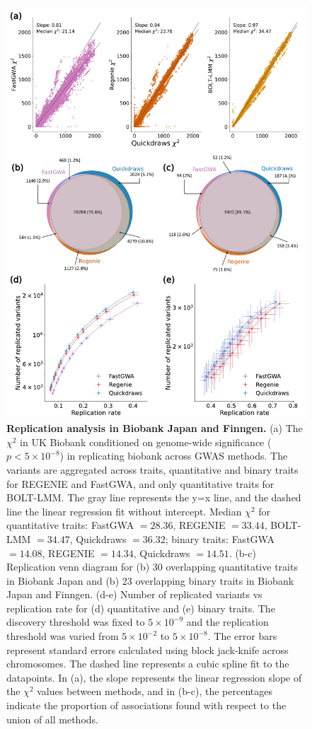 \begin{figure}[h!]
    \centering
    \includegraphics[scale=0.7]{figures/qd_panel_replication.pdf}
    \caption{\textbf{Replication analysis in Biobank Japan and Finngen.} (a) The $\chi^2$ in UK Biobank conditioned on genome-wide significance ($p < 5 \times 10^{-8}$) in replicating biobank across GWAS methods. The variants are aggregated across traits, quantitative and binary traits for REGENIE and FastGWA, and only quantitative traits for BOLT-LMM. The gray line represents the y=x line, and the dashed line the linear regression fit without intercept. Median $\chi^2$ for quantitative traits: FastGWA $= 28.36$, REGENIE $= 33.44$, BOLT-LMM $= 34.47$, Quickdraws $= 36.32$; binary traits: FastGWA $= 14.08$, REGENIE $= 14.34$, Quickdraws $= 14.51$. (b-c) Replication venn diagram for (b) 30 overlapping quantitative traits in Biobank Japan and (b) 23 overlapping binary traits in Biobank Japan and Finngen. (d-e) Number of replicated variants vs replication rate for (d) quantitative and (e) binary traits. The discovery threshold was fixed to $5 \times 10^{-9}$ and the replication threshold was varied from $5 \times 10^{-2}$ to $5 \times 10^{-8}$. The error bars represent standard errors calculated using block jack-knife across chromosomes. The dashed line represents a cubic spline fit to the datapoints. In (a), the slope represents the linear regression slope of the $\chi^2$ values between methods, and in (b-c), the percentages indicate the proportion of associations found with respect to the union of all methods.}
    \label{fig:ukb_repl}
\end{figure}




